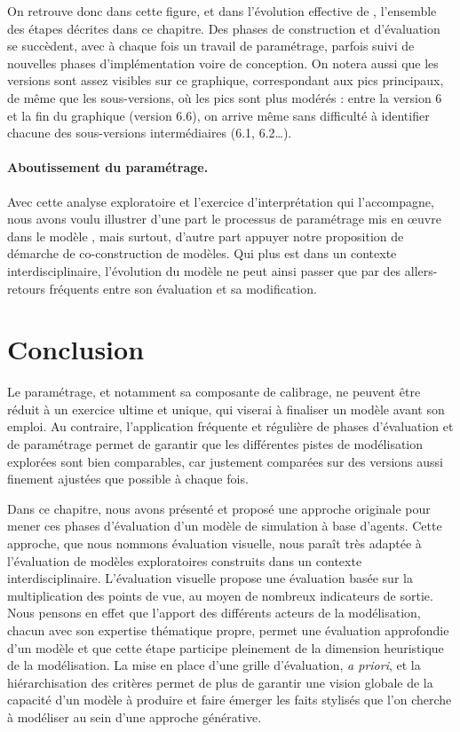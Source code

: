 On retrouve donc dans cette figure, et dans l'évolution effective de \simfeodal{}, l'ensemble des étapes décrites dans ce chapitre.
Des phases de construction et d'évaluation se succèdent, avec à chaque fois un travail de paramétrage, parfois suivi de nouvelles phases d'implémentation voire de conception.
On notera aussi que les versions sont assez visibles sur ce graphique, correspondant aux pics principaux, de même que les sous-versions, où les pics sont plus modérés : entre la version 6 et la fin du graphique (version 6.6), on arrive même sans difficulté à identifier chacune des sous-versions intermédiaires (6.1, 6.2\ldots).

\paragraph{Aboutissement du paramétrage.}

Avec cette analyse exploratoire et l'exercice d'interprétation qui l'accompagne, nous avons voulu illustrer d'une part le processus de paramétrage mis en œuvre dans le modèle \simfeodal{}, mais surtout, d'autre part appuyer notre proposition de démarche de co-construction de modèles.
Qui plus est dans un contexte interdisciplinaire, l'évolution du modèle ne peut ainsi passer que par des allers-retours fréquents entre son évaluation et sa modification.

\section*{Conclusion}
\label{sec:chap3-conclu}

Le paramétrage, et notamment sa composante de calibrage, ne peuvent être réduit à un exercice ultime et unique, qui viserai à \og finaliser\fg{} un modèle avant son emploi.
Au contraire, l'application fréquente et régulière de phases d'évaluation et de paramétrage permet de garantir que les différentes pistes de modélisation explorées sont bien comparables, car justement comparées sur des versions aussi finement ajustées que possible à chaque fois.

Dans ce chapitre, nous avons présenté et proposé une approche originale pour mener ces phases d'évaluation d'un modèle de simulation à base d'agents.
Cette approche, que nous nommons évaluation visuelle, nous paraît très adaptée à l'évaluation de modèles exploratoires construits dans un contexte interdisciplinaire.
L'évaluation visuelle propose une évaluation basée sur la multiplication des points de vue, au moyen de nombreux indicateurs de sortie.
Nous pensons en effet que l'apport des différents acteurs de la modélisation, chacun avec son expertise thématique propre, permet une évaluation approfondie d'un modèle et que cette étape participe pleinement de la dimension heuristique de la modélisation.
La mise en place d'une grille d'évaluation, \textit{a priori}, et la hiérarchisation des critères permet de plus de garantir une vision globale de la capacité d'un modèle à produire et faire émerger les faits stylisés que l'on cherche à modéliser au sein d'une approche générative.


